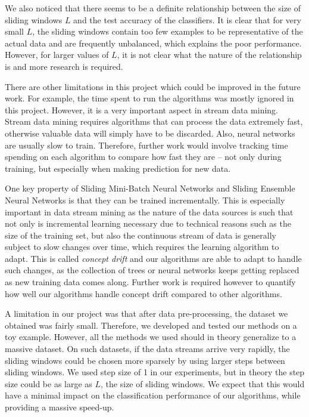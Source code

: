 \documentclass[conference]{IEEEtran}
\begin{document}
		We also noticed that there seems to be a definite relationship between the size of sliding windows $L$ and the test accuracy of the classifiers. It is clear that for very small $L$, the sliding windows contain too few examples to be representative of the actual data and are frequently unbalanced, which explains the poor performance. However, for larger values of $L$, it is not clear what the nature of the relationship is and more research is required.
		
		There are other limitations in this project which could be improved in the future work. For example, the time spent to run the algorithms was mostly ignored in this project. However, it is a very important aspect in stream data mining. Stream data mining requires algorithms that can process the data extremely fast, otherwise valuable data will simply have to be discarded. Also, neural networks are usually slow to train. Therefore, further work would involve tracking time spending on each algorithm to compare how fast they are -- not only during training, but especially when making prediction for new data.
		
		
		One key property of   Sliding Mini-Batch Neural Networks and Sliding Ensemble Neural Networks is that they can be trained incrementally. This is especially important in data stream mining as the nature of the data sources is such that not only is incremental learning necessary due to technical reasons such as the size of the training set, but also the continuous stream of data is generally subject to slow changes over time, which requires the learning algorithm to adapt. This is called \emph{concept drift} and our algorithms are able to adapt to handle such changes, as the collection of trees or neural networks keeps getting replaced as new training data comes along. Further work is required however to quantify how well our algorithms handle concept drift compared to other algorithms.
		
		A limitation in our project was that after data pre-processing, the dataset we obtained was fairly small. Therefore, we developed and tested our methods on a toy example. However, all the methods we used should in theory generalize to a massive dataset. On such datasets, if the data streams arrive very rapidly, the sliding windows could be chosen more sparsely by using larger steps between sliding windows. We used step size of 1 in our experiments, but in theory the step size could be as large as $L$, the size of sliding windows. We expect that this would have a minimal impact on the classification performance of our algorithms, while providing a massive speed-up.
		
\end{document}

